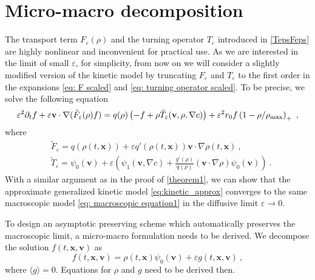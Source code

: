 \documentclass[review,onefignum,onetabnum]{siamart220329}
\newcommand {\e}  {\varepsilon}
\newcommand {\bv} { {\mathbf{v}} }
\newcommand {\bx} { {\mathbf{x}} }
\newcommand {\p}   {\partial}
\newcommand{\beq}{\begin{equation}}
\newcommand{\eeq}{\end{equation}}
\begin{document}
\section{Micro-macro decomposition}\label{sec:micro-macro}
{ 
The transport term $F_\varepsilon(\rho)$ and the turning operator $T_\varepsilon$ introduced in \cref{TepsFeps} are highly nonlinear and inconvenient for practical use.
As we are interested in the limit of small $\varepsilon$, for simplicity, from now on we will consider a slightly modified version of the kinetic model by truncating $F_\varepsilon$ and $T_\varepsilon$ to the first order in the expansions \cref{eq: F scaled} and \cref{eq: turning operator scaled}.
To be precise, we solve the following equation }
\beq
\label{eq:kinetic_approx}
	\e^2 \p_t f + \e \bv \cdot \nabla(\tilde{F}_\varepsilon(\rho)f) = q(\rho) \left(-f + \rho \tilde{T}_\varepsilon(\bv, \rho, \nabla c)\right) + \e^2 r_0f\left(1-\rho/\rho_{\textnormal{max}}\right)_+\ ,
\eeq
where
\begin{align*}
    &\tilde{F}_\varepsilon = q(\rho(t,\bx)) + \varepsilon q'(\rho(t,\bx))\bv\cdot\nabla\rho(t,\bx)\ ,\\
    &\tilde{T}_\varepsilon = \psi_0(\bv) + \varepsilon\left(\psi_1(\bv,\nabla c) + \frac{q'(\rho)}{q(\rho)}(\bv\cdot\nabla\rho)\psi_0(\bv)\right)\ .
\end{align*}
With a similar argument as in the proof of \cref{theorem1}, we can show that the approximate generalized kinetic model \cref{eq:kinetic_approx} converges to the same macroscopic model \cref{eq: macroscopic equation1} in the diffusive limit $\varepsilon\to 0$.

To design an asymptotic preserving scheme which automatically preserves the macroscopic limit, a micro-macro formulation needs to be derived. 
We decompose the solution $f(t,\bx,\bv)$ as 
\begin{equation}\label{def:f_decompose}
    f(t,\bx,\bv) = \rho(t,\bx) \psi_0(\bv) + \varepsilon g(t,\bx,\bv)\ ,
\end{equation}
where $\langle g\rangle = 0$. 
Equations for $\rho$ and $g$ need to be derived then. 
\end{document}
